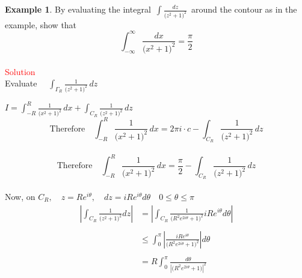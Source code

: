 \documentclass[11pt,a4paper]{article}
\theoremstyle{definition}
\newtheorem{example}[thm]{Example}
\begin{document}
\begin{example}
By evaluating the integral $\,\displaystyle{\int \frac{dz}{\big(z^2 + 1\big)^2}\,}$ around the contour as in the example, show that $$\int^{\infty}_{-\infty} \frac{d x}{\big(x^2 + 1\big)^2} = \frac{\pi}{2}$$\\


\textcolor{red}{Solution}\\
Evaluate $\quad \displaystyle{\int_{\Gamma_R} \frac{1}{\big(z^2 + 1\big)^2}\,dz}$



\begin{figure}[H]
\centering
{}
\end{figure}















$I = \displaystyle{\int^R_{-R} \frac{1}{\big(x^2 + 1\big)^2}\,dx + \int_{C_R} \frac{1}{\big( z^2 + 1\big)^2}\,dz}$\\


$$\text{Therefore}\quad  \int^R_{-R} \frac{1}{\big(x^2 + 1\big)^2}\,dx = 2\pi i\cdot c - \int_{C_R} \frac{1}{\big( z^2 + 1\big)^2}\,dz$$\\


$$\text{Therefore}\quad  \int^R_{-R} \frac{1}{\big(x^2 + 1\big)^2}\,dx = \frac{\pi}{2} - \int_{C_R} \frac{1}{\big( z^2 + 1\big)^2}\,dz$$\\

Now, on $C_R,\quad  z = Re^{i\theta},\quad  dz = iRe^{i\theta}d\theta\quad  0 \leq \theta \leq \pi$
\begin{align*}
\left|\displaystyle{\int_{C_R}} \frac{1}{\big(z^2 + 1\big)^2}dz\right|& = \left|\displaystyle{\int_{C_R}} \frac{1}{\Big(R^2e^{2i\theta} + 1 \Big)^2}iRe^{i\theta}d\theta\right|\\\\
& \leq \int^{\pi}_0 \left|\frac{iRe^{i\theta}}{\Big(R^2e^{2i\theta} + 1\Big)^2}\right|d\theta\\\\
& = R\int^{\pi}_0 \frac{d\theta}{\left|\Big( R^2e^{2i\theta} + 1 \Big)\right|^2}\\
\end{align*}


\end{example}
\end{document}
